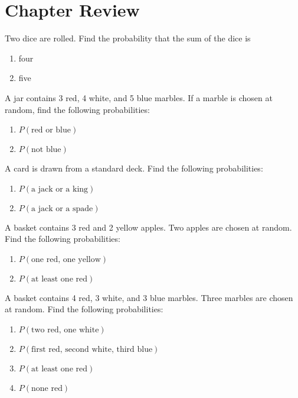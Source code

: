 \section{Chapter Review}

\begin{puzzle}
    Two dice are rolled. Find the probability that the sum of the dice is
    \begin{enumerate}
        \item four
        \item five
    \end{enumerate}
\end{puzzle}

\begin{puzzle}
    A jar contains 3 red, 4 white, and 5 blue marbles. If a marble is chosen at random, find the following probabilities:
    \begin{enumerate}
        \item \( P(\text{red or blue}) \)
        \item \( P(\text{not blue}) \)
    \end{enumerate}
\end{puzzle}

\begin{puzzle}
    A card is drawn from a standard deck. Find the following probabilities:
    \begin{enumerate}
        \item \( P(\text{a jack or a king}) \)
        \item \( P(\text{a jack or a spade}) \)
    \end{enumerate}
\end{puzzle}

\begin{puzzle}
    A basket contains 3 red and 2 yellow apples. Two apples are chosen at random. Find the following probabilities:
    \begin{enumerate}
        \item \( P(\text{one red, one yellow}) \)
        \item \( P(\text{at least one red}) \)
    \end{enumerate}
\end{puzzle}

\begin{puzzle}
    A basket contains 4 red, 3 white, and 3 blue marbles. Three marbles are chosen at random. Find the following probabilities:
    \begin{enumerate}
        \item \( P(\text{two red, one white}) \)
        \item \( P(\text{first red, second white, third blue}) \)
        \item \( P(\text{at least one red}) \)
        \item \( P(\text{none red}) \)
    \end{enumerate}
\end{puzzle}

